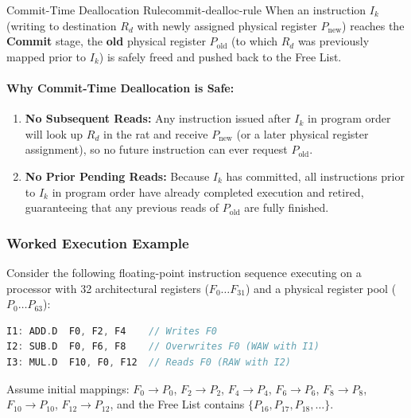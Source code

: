 \begin{definition}{Commit-Time Deallocation Rule}{commit-dealloc-rule}
    When an instruction $I_k$ (writing to destination $R_d$ with newly assigned physical register $P_{\text{new}}$) reaches the \textbf{Commit} stage, the \textbf{old} physical register $P_{\text{old}}$ (to which $R_d$ was previously mapped prior to $I_k$) is safely freed and pushed back to the Free List.
\end{definition}

\paragraph{Why Commit-Time Deallocation is Safe:}
\begin{enumerate}
    \item \textbf{No Subsequent Reads:} Any instruction issued after $I_k$ in program order will look up $R_d$ in the \gls{rat} and receive $P_{\text{new}}$ (or a later physical register assignment), so no future instruction can ever request $P_{\text{old}}$.
    \item \textbf{No Prior Pending Reads:} Because $I_k$ has committed, all instructions prior to $I_k$ in program order have already completed execution and retired, guaranteeing that any previous reads of $P_{\text{old}}$ are fully finished.
\end{enumerate}

\subsubsection{Worked Execution Example}
Consider the following floating-point instruction sequence executing on a processor with 32 architectural registers ($F_0 \dots F_{31}$) and a physical register pool ($P_0 \dots P_{63}$):

\begin{lstlisting}[language=C]
I1: ADD.D  F0, F2, F4    // Writes F0
I2: SUB.D  F0, F6, F8    // Overwrites F0 (WAW with I1)
I3: MUL.D  F10, F0, F12  // Reads F0 (RAW with I2)
\end{lstlisting}

Assume initial mappings: $F_0 \to P_0$, $F_2 \to P_2$, $F_4 \to P_4$, $F_6 \to P_6$, $F_8 \to P_8$, $F_{10} \to P_{10}$, $F_{12} \to P_{12}$, and the Free List contains $\{P_{16}, P_{17}, P_{18}, \dots\}$.

